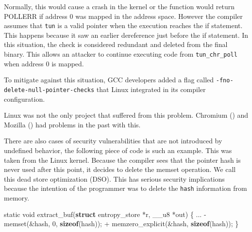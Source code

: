 \documentclass[
  a4paper,
]{report}
\newenvironment{Shaded}{}{}
\newcommand{\DataTypeTok}[1]{\textcolor[rgb]{0.56,0.13,0.00}{#1}}
\newcommand{\DecValTok}[1]{\textcolor[rgb]{0.25,0.63,0.44}{#1}}
\newcommand{\KeywordTok}[1]{\textcolor[rgb]{0.00,0.44,0.13}{\textbf{#1}}}
\newcommand{\NormalTok}[1]{#1}
\newcommand{\OperatorTok}[1]{\textcolor[rgb]{0.40,0.40,0.40}{#1}}
\begin{document}
Normally, this would cause a crash in the kernel or the function would
return POLLERR if address 0 was mapped in the address space. However the
compiler assumes that \texttt{tun} is a valid pointer when the execution
reaches the if statement. This happens because it saw an earlier
dereference just before the if statement. In this situation, the check
is considered redundant and deleted from the final binary. This allows
an attacker to continue executing code from \texttt{tun\_chr\_poll} when
address 0 is mapped.

To mitigate against this situation, GCC developers added a flag called
\texttt{-fno-delete-null-pointer-checks} that Linux integrated in its
compiler configuration.

Linux was not the only project that suffered from this problem. Chromium
() and Mozilla () had
problems in the past with this.

There are also cases of security vulnerabilities that are not introduced
by undefined behavior, the following piece of code is such an example.
This was taken from the Linux kernel. Because the compiler sees that the
pointer hash is never used after this point, it decides to delete the
memset operation. We call this
\label{__index_entry_183}{dead store optimization
(DSO)}. This has serious security
implications because the intention of the programmer was to delete the
\texttt{hash} information from memory.

\begin{Shaded}
\begin{Highlighting}[]
\DataTypeTok{static} \DataTypeTok{void}\NormalTok{ extract\_buf}\OperatorTok{(}\KeywordTok{struct}\NormalTok{ entropy\_store }\OperatorTok{*}\NormalTok{r}\OperatorTok{,}\NormalTok{ \_\_u8 }\OperatorTok{*}\NormalTok{out}\OperatorTok{)} \OperatorTok{\{}
  \OperatorTok{...}
  \OperatorTok{{-}}\NormalTok{ memset}\OperatorTok{(\&}\NormalTok{hash}\OperatorTok{,} \DecValTok{0}\OperatorTok{,} \KeywordTok{sizeof}\OperatorTok{(}\NormalTok{hash}\OperatorTok{));}
  \OperatorTok{+}\NormalTok{ memzero\_explicit}\OperatorTok{(\&}\NormalTok{hash}\OperatorTok{,} \KeywordTok{sizeof}\OperatorTok{(}\NormalTok{hash}\OperatorTok{));}
\OperatorTok{\}}
\end{Highlighting}
\end{Shaded}
\end{document}
